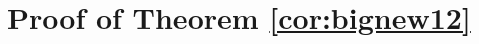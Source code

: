 \documentclass[11pt,a4paper]{article}
\newtheorem{Corollary}[Satz]{Corollary}
\theoremstyle{definition}
\theoremstyle{remark}
\begin{document}
%	
%



\section{Proof of Theorem \ref{cor:bignew12}}
\end{document}
